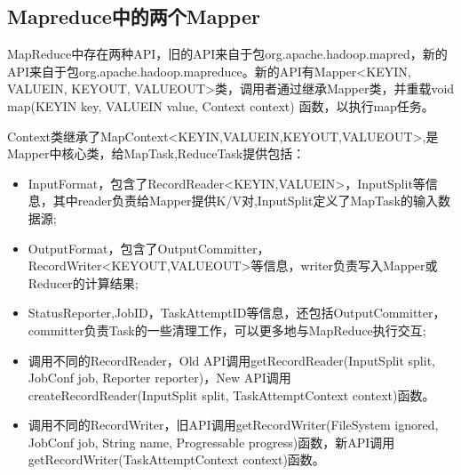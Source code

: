 \subsection{Mapreduce中的两个Mapper}
\par MapReduce中存在两种API，旧的API来自于包org.apache.hadoop.mapred，新的API来自于包org.apache.hadoop.mapreduce。新的API有Mapper<KEYIN, VALUEIN, KEYOUT, VALUEOUT>类，调用者通过继承Mapper类，并重载void map(KEYIN key, VALUEIN value, Context context) 函数，以执行map任务。
\par Context类继承了MapContext<KEYIN,VALUEIN,KEYOUT,VALUEOUT>,是Mapper中核心类，给MapTask,ReduceTask提供包括：
\begin{itemize}
\item InputFormat，包含了RecordReader<KEYIN,VALUEIN>，InputSplit等信息，其中reader负责给Mapper提供K/V对,InputSplit定义了MapTask的输入数据源;
\item OutputFormat，包含了OutputCommitter，RecordWriter<KEYOUT,VALUEOUT>等信息，writer负责写入Mapper或Reducer的计算结果;
\item StatusReporter,JobID，TaskAttemptID等信息，还包括OutputCommitter，committer负责Task的一些清理工作，可以更多地与MapReduce执行交互;
\item 调用不同的RecordReader，Old API调用getRecordReader(InputSplit split, JobConf job, Reporter reporter)，New API调用createRecordReader(InputSplit split, TaskAttemptContext context)函数。
\item 调用不同的RecordWriter，旧API调用getRecordWriter(FileSystem ignored, JobConf job, String name, Progressable progress)函数，新API调用getRecordWriter(TaskAttemptContext context)函数。
\end{itemize}
